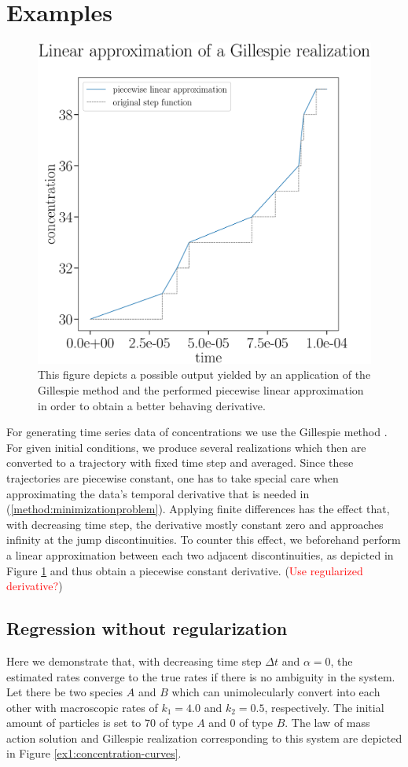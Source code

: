\documentclass[oneside, abstracton, titlepage]{scrartcl}
\begin{document}
	\section{Examples}
	
	\begin{figure}
		\begin{center}
			\includegraphics[width=.5\textwidth]{./figures_tex/aux_linear_approximation.eps}
		\end{center}
		\caption{This figure depicts a possible output yielded by an application of the Gillespie method and the performed piecewise linear approximation in order to obtain a better behaving derivative.}
		\label{examples:linear-approximation}
	\end{figure}
	
	For generating time series data of concentrations we use the Gillespie method \cite{Gillespie1976}. For given initial conditions, we produce several realizations which then are converted to a trajectory with fixed time step and averaged. Since these trajectories are piecewise constant, one has to take special care when approximating the data's temporal derivative that is needed in (\ref{method:minimizationproblem}). Applying finite differences has the effect that, with decreasing time step, the derivative mostly constant zero and approaches infinity at the jump discontinuities. To counter this effect, we beforehand perform a linear approximation between each two adjacent discontinuities, as depicted in Figure \ref{examples:linear-approximation} and thus obtain a piecewise constant derivative. (\textcolor{red}{Use regularized derivative?})
	
	\subsection{Regression without regularization}
	\label{sec:ex1}
	
	Here we demonstrate that, with decreasing time step $\Delta t$ and $\alpha=0$, the estimated rates converge to the true rates if there is no ambiguity in the system. Let there be two species $A$ and $B$ which can unimolecularly convert into each other with macroscopic rates of $k_1=4.0$ and $k_2=0.5$, respectively. The initial amount of particles is set to $70$ of type $A$ and $0$ of type $B$. The law of mass action solution and Gillespie realization corresponding to this system are depicted in Figure \ref{ex1:concentration-curves}.
	
\end{document}
